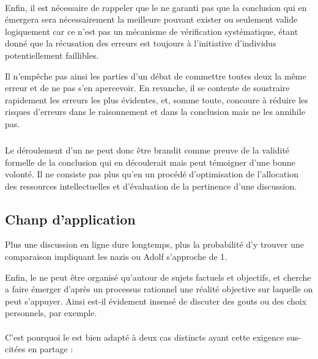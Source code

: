 \paragraph{}
Enfin, il est nécessaire de rappeler que le \mainabbr{} ne garanti pas que la conclusion qui en émergera sera nécessairement la meilleure pouvant exister ou seulement valide logiquement car ce n’est pas un mécanisme de vérification systématique, étant donné que la récusation des erreurs est toujours à l’initiative d’individus potentiellement faillibles.

Il n’empêche pas ainsi les parties d’un débat de commettre toutes deux la même erreur et de ne pas s’en apercevoir. En revanche, il se contente de soustraire rapidement les erreurs les plus évidentes, et, somme toute, concoure à réduire les risques d’erreurs dans le raisonnement et dans la conclusion mais ne les annihile pas.

\subparagraph{}
Le déroulement d’un \mainabbr{} ne peut donc être brandit comme preuve de la validité formelle de la conclusion qui en découlerait mais peut témoigner d’une bonne volonté. Il ne consiste pas plus qu’en un procédé d’optimisation de l’allocation des ressources intellectuelles et d’évaluation de la pertinence d’une discussion.

\subsection{Chanp d’application}
\epigraph{Plus une discussion en ligne dure longtemps, plus la probabilité d’y trouver une comparaison impliquant les nazis ou Adolf  s’approche de 1.}{}
Enfin, le \mainabbr{} ne peut être organisé qu’autour de sujets factuels et objectifs, et cherche a faire émerger d’après un processus rationnel une réalité objective sur laquelle on peut s’appuyer. Ainsi est-il évidement insensé de discuter des gouts ou des choix personnels, par exemple.

\paragraph*{}
C’est pourquoi le \mainabbr{} est bien adapté à deux cas distincts ayant cette exigence sus-citées en partage :

